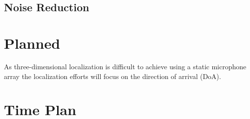 \documentclass[
    fontsize=12pt,
    headings=small,
    parskip=half,           %
    bibliography=totoc,
    numbers=noenddot,       %
    open=any,               %
]{scrreprt}
\begin{document}
\section{Noise Reduction}


\chapter{Planned}

As three-dimensional localization is difficult to achieve using a static
microphone array \cite{LOCATA} the localization efforts will focus on the
direction of arrival (DoA).

\chapter{Time Plan}

\begin{raggedright}         %
    \printbibliography        %
\end{raggedright}

\listoftodos
\end{document}
